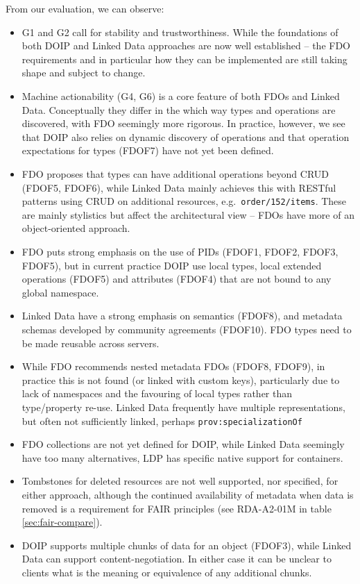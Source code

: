 \documentclass[fleqn,10pt,lineno]{wlpeerj}
\providecommand{\tightlist}{%
  \setlength{\itemsep}{0pt}\setlength{\parskip}{0pt}}
\begin{document}
From our evaluation, we can observe:

\begin{itemize}
\tightlist
\item
  G1 and G2 call for stability and trustworthiness. While the foundations of both DOIP and Linked Data approaches are now well established -- the FDO requirements and in particular how they can be implemented are still taking shape and subject to change.
\item
  Machine actionability (G4, G6) is a core feature of both FDOs and Linked Data. Conceptually they differ in the which way types and operations are discovered, with FDO seemingly more rigorous. In practice, however, we see that DOIP also relies on dynamic discovery of operations and that operation expectations for types (FDOF7) have not yet been defined.
\item
  FDO proposes that types can have additional operations beyond CRUD (FDOF5, FDOF6), while Linked Data mainly achieves this with RESTful patterns using CRUD on additional resources, e.g.~\texttt{order/152/items}. These are mainly stylistics but affect the architectural view -- FDOs have more of an object-oriented approach.
\item
  FDO puts strong emphasis on the use of PIDs (FDOF1, FDOF2, FDOF3, FDOF5), but in current practice DOIP use local types, local extended operations (FDOF5) and attributes (FDOF4) that are not bound to any global namespace.
\item
  Linked Data have a strong emphasis on semantics (FDOF8), and metadata schemas developed by community agreements (FDOF10). FDO types need to be made reusable across servers.
\item
  While FDO recommends nested metadata FDOs (FDOF8, FDOF9), in practice this is not found (or linked with custom keys), particularly due to lack of namespaces and the favouring of local types rather than type/property re-use. Linked Data frequently have multiple representations, but often not sufficiently linked, perhaps \texttt{prov:specializationOf} \cite{9T4j3N4e}
\item
  FDO collections are not yet defined for DOIP, while Linked Data seemingly have too many alternatives, LDP has specific native support for containers.
\item
  Tombstones for deleted resources are not well supported, nor specified, for either approach, although the continued availability of metadata when data is removed is a requirement for FAIR principles (see RDA-A2-01M in table \ref{sec:fair-compare}).
\item
  DOIP supports multiple chunks of data for an object (FDOF3), while Linked Data can support content-negotiation. In either case it can be unclear to clients what is the meaning or equivalence of any additional chunks.
\end{itemize}
\end{document}
